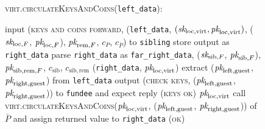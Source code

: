 \begin{figure}[H]
  \begin{processbox}{\textsc{virt}.\textsc{circulateKeysAndCoins}(\texttt{left\_data}):}
    \begin{algorithmic}[1]
       
         
          \State input (\textsc{keys and coins forward}, (\texttt{left\_data},
          $(\textit{sk}_{\mathrm{loc}, \mathrm{virt}}, \textit{pk}_{\mathrm{loc},
          \mathrm{virt}})$, ($\textit{sk}_{\mathrm{loc}, F}$, $\textit{pk}_{\mathrm{loc}, F}$),
          $\textit{pk}_{\mathrm{rem}, F}$, $c_P$, $c_{\bar{P}}$) to \texttt{sibling}
          \State {}
          \State {}
          \State {}
          \State {}
          \State {}
          \State store output as \texttt{right\_data}
          \State parse \texttt{right\_data} as \texttt{far\_right\_data},
          ($\textit{sk}_{\mathrm{sib}, F}$, $\textit{pk}_{\mathrm{sib}, F}$), $\textit{pk}_{\mathrm{sib},
          \mathrm{rem}, F}$, $c_{\mathrm{sib}}$, $c_{\mathrm{sib},
          \mathrm{rem}}$
          \State \Return (\texttt{right\_data}, $\textit{pk}_{\mathrm{loc},
          \mathrm{virt}}$)
        \Else \: 
          \State extract ($\textit{pk}_{\mathrm{left}, \mathrm{guest}}$,
          $\textit{pk}_{\mathrm{right}, \mathrm{guest}}$) from \texttt{left\_data}
          \State output (\textsc{check keys}, ($\textit{pk}_{\mathrm{left},
          \mathrm{guest}}$, $\textit{pk}_{\mathrm{right}, \mathrm{guest}}$)) to
          \texttt{fundee} and expect reply (\textsc{keys ok})
          \State \Return $\textit{pk}_{\mathrm{loc}, \mathrm{virt}}$
        \EndIf
      \Else \: 
        \State call \textsc{virt.circulateKeysAndCoins}($\textit{pk}_{\mathrm{loc},
        \mathrm{virt}}$, ($\textit{pk}_{\mathrm{left}, \mathrm{guest}}$,
        $\textit{pk}_{\mathrm{right}, \mathrm{guest}}$)) of $\bar{P}$ and assign
        returned value to \texttt{right\_data}
        \State \Return (\textsc{ok})
      \EndIf
    \end{algorithmic}
  \end{processbox}
  \caption{}
  \label{code:virtual-layer:circulate-keys-and-coins}
\end{figure}

